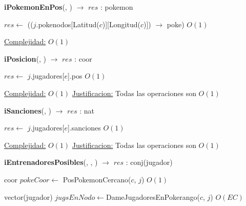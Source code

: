 \begin{Algoritmos}

\begin{algorithm}[H]
{\textbf{iPokemonEnPos}(, ) $\to$ $res$ : pokemon}
\begin{algorithmic}[1]

\State $res \gets$ (($j$.pokenodos[Latitud($c$)][Longitud($c$)]) $\rightarrow$ poke) \Comment $O(1)$
 
\medskip
\Statex \underline{Complejidad:} $O(1)$
\end{algorithmic}
\end{algorithm}




\begin{algorithm}[H]
{\textbf{iPosicion}(, ) $\to$ $res$ : coor}
\begin{algorithmic}[1]

\State $res \gets$ $j$.jugadores[$e$].pos \Comment $O(1)$

\medskip
\State \underline{Complejidad:} $O(1)$
\State \underline{Justificacion:} Todas las operaciones son $O(1)$


\end{algorithmic}
\end{algorithm}



\begin{algorithm}[H]
{\textbf{iSanciones}(, ) $\to$ $res$ : nat}
\begin{algorithmic}[1]

\State $res \gets$ $j$.jugadores[$e$].sanciones \Comment $O(1)$

\medskip
\State \underline{Complejidad:} $O(1)$
\State \underline{Justificacion:} Todas las operaciones son $O(1)$


\end{algorithmic}
\end{algorithm}


\begin{algorithm}[H]
{\textbf{iEntrenadoresPosibles}(, , ) $\to$ $res$ : conj(jugador)}
\begin{algorithmic}[1]

\State coor $pokeCoor \gets$ PosPokemonCercano($c$, $j$) \Comment $O(1)$

\State vector(jugador) $jugsEnNodo \gets$DameJugadoresEnPokerango($c$, $j$)     \Comment $O(EC)$


\end{algorithmic}
\end{algorithm}
\end{Algoritmos}
